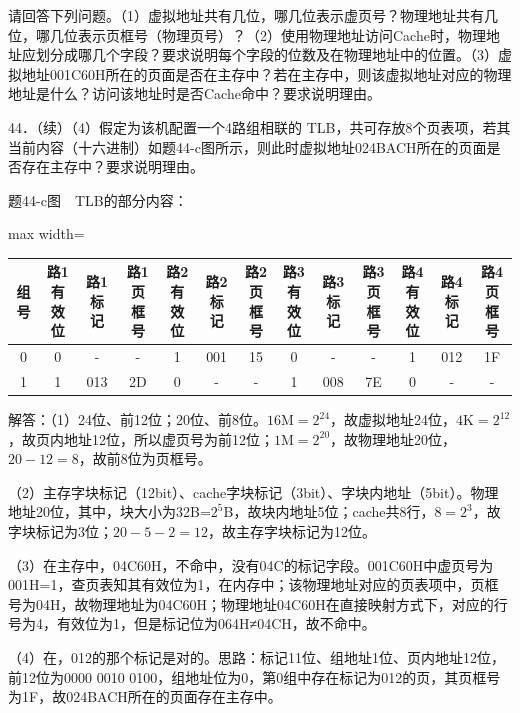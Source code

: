 \documentclass[UTF8,11pt]{ctexart}
\begin{document}
请回答下列问题。（1）虚拟地址共有几位，哪几位表示虚页号？物理地址共有几位，哪几位表示页框号（物理页号）？（2）使用物理地址访问Cache时，物理地址应划分成哪几个字段？要求说明每个字段的位数及在物理地址中的位置。（3）虚拟地址001C60H所在的页面是否在主存中？若在主存中，则该虚拟地址对应的物理地址是什么？访问该地址时是否Cache命中？要求说明理由。


44．（续）（4）假定为该机配置一个4路组相联的 TLB，共可存放8个页表项，若其当前内容（十六进制）如题44-c图所示，则此时虚拟地址024BACH所在的页面是否存在主存中？要求说明理由。


题44-c图　TLB的部分内容：


\begin{center}\begin{adjustbox}{max width=\linewidth}\begin{tabular}{|c|c|c|c|c|c|c|c|c|c|c|c|c|}\hline
组号 & 路1有效位 & 路1标记 & 路1页框号 & 路2有效位 & 路2标记 & 路2页框号 & 路3有效位 & 路3标记 & 路3页框号 & 路4有效位 & 路4标记 & 路4页框号\\\hline
0 & 0 & - & - & 1 & 001 & 15 & 0 & - & - & 1 & 012 & 1F\\\hline
1 & 1 & 013 & 2D & 0 & - & - & 1 & 008 & 7E & 0 & - & -\\\hline\end{tabular}\end{adjustbox}\end{center}

解答：（1）24位、前12位；20位、前8位。\(\displaystyle 16\mathrm M=2^{24}\)，故虚拟地址24位，\(\displaystyle 4\mathrm K=2^{12}\)，故页内地址12位，所以虚页号为前12位；\(\displaystyle 1\mathrm M=2^{20}\)，故物理地址20位，\(\displaystyle 20-12=8\)，故前8位为页框号。


（2）主存字块标记（12bit）、cache字块标记（3bit）、字块内地址（5bit）。物理地址20位，其中，块大小为32B=\(\displaystyle 2^5\)B，故块内地址5位；cache共8行，\(\displaystyle 8=2^3\)，故字块标记为3位；\(\displaystyle 20-5-2=12\)，故主存字块标记为12位。


（3）在主存中，04C60H，不命中，没有04C的标记字段。001C60H中虚页号为001H=1，查页表知其有效位为1，在内存中；该物理地址对应的页表项中，页框号为04H，故物理地址为04C60H；物理地址04C60H在直接映射方式下，对应的行号为4，有效位为1，但是标记位为064H≠04CH，故不命中。


（4）在，012的那个标记是对的。思路：标记11位、组地址1位、页内地址12位，前12位为0000 0010 0100，组地址位为0，第0组中存在标记为012的页，其页框号为1F，故024BACH所在的页面存在主存中。
\end{document}
